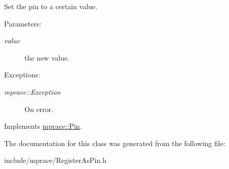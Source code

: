 Set the pin to a certain value. 

\begin{Desc}
\item[Parameters:]
\begin{description}
\item[{\em value}]the new value. \end{description}
\end{Desc}
\begin{Desc}
\item[Exceptions:]
\begin{description}
\item[{\em mprace::Exception}]On error.\end{description}
\end{Desc}


Implements \hyperlink{classmprace_1_1Pin_a1}{mprace::Pin}.

The documentation for this class was generated from the following file:\begin{CompactItemize}
\item 
include/mprace/Register\-As\-Pin.h\end{CompactItemize}
